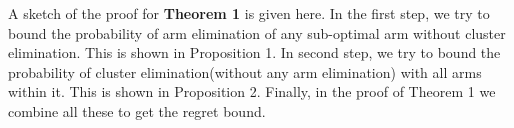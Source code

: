 \begin{remark}
A sketch of the proof for \textbf{Theorem 1} is given here. In the first step, we try to bound the probability of arm elimination of any sub-optimal arm without cluster elimination. This is shown in Proposition 1. In second step, we try to bound the probability of cluster elimination(without any arm elimination) with all arms within it. This is shown in Proposition 2. Finally, in the proof of Theorem 1 we combine all these to get the regret bound.  
\end{remark}
	




